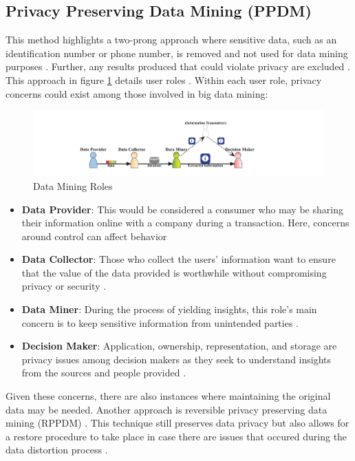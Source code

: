 \documentclass[sigconf]{acmart}
\begin{document}
\subsection{Privacy Preserving Data Mining (PPDM)} This method highlights a two-prong approach where sensitive data, such as an identification number or phone number, is removed and not used for data mining purposes \cite{Xu2014}. Further, any results produced that could violate privacy are excluded \cite{Xu2014}. This approach in figure \ref{f:Data Mining Roles} details user roles \cite{Xu2014}. Within each user role, privacy concerns could exist among those involved in big data mining:
\begin{figure}[!ht]
  \centering\includegraphics[width=\columnwidth]{roles.jpg}
  \caption{Data Mining Roles}\label{f:Data Mining Roles}
\end{figure}
\begin{itemize}
 \item \textbf{Data Provider}: This would be considered a consumer who may be sharing their information online with a company during a transaction. Here, concerns around control can affect behavior \cite{Xu2014}
 \item \textbf{Data Collector}: Those who collect the users' information want to ensure that the value of the data provided is worthwhile without compromising privacy or security \cite{Xu2014}.
 \item \textbf{Data Miner}: During the process of yielding insights, this role's main concern is to keep sensitive information from unintended parties \cite{Xu2014}. 
 \item \textbf{Decision Maker}: Application, ownership, representation, and storage are privacy issues among decision makers as they seek to understand insights from the sources and people provided \cite{Xu2014}. 
 \end{itemize}

Given these concerns, there are also instances where maintaining the original data may be needed. Another approach is reversible privacy preserving data mining (RPPDM) \cite{Chen2013}. This technique still preserves data privacy but also allows for a restore procedure to take place in case there are issues that occured during the data distortion process \cite{Chen2013}. 
\end{document}
